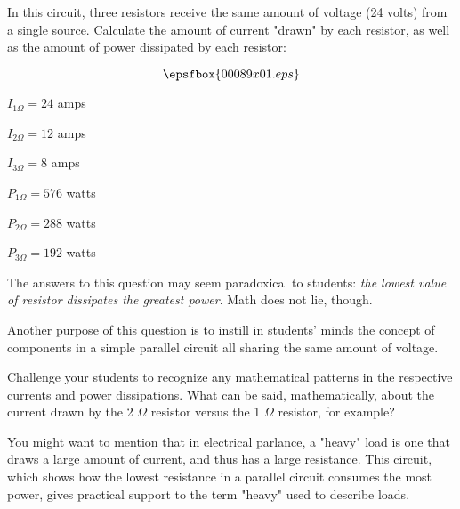 

In this circuit, three resistors receive the same amount of voltage (24 volts) from a single source.  Calculate the amount of current "drawn" by each resistor, as well as the amount of power dissipated by each resistor:

$$\epsfbox{00089x01.eps}$$







$I_{1 \Omega} = 24$ amps

$I_{2 \Omega} = 12$ amps

$I_{3 \Omega} = 8$ amps

\vskip 10pt

$P_{1 \Omega} = 576$ watts

$P_{2 \Omega} = 288$ watts

$P_{3 \Omega} = 192$ watts







The answers to this question may seem paradoxical to students: {\it the lowest value of resistor dissipates the greatest power}.  Math does not lie, though.

Another purpose of this question is to instill in students' minds the concept of components in a simple parallel circuit all sharing the same amount of voltage.

Challenge your students to recognize any mathematical patterns in the respective currents and power dissipations.  What can be said, mathematically, about the current drawn by the 2 $\Omega$ resistor versus the 1 $\Omega$ resistor, for example?

You might want to mention that in electrical parlance, a "heavy" load is one that draws a large amount of current, and thus has a large resistance.  This circuit, which shows how the lowest resistance in a parallel circuit consumes the most power, gives practical support to the term "heavy" used to describe loads.




